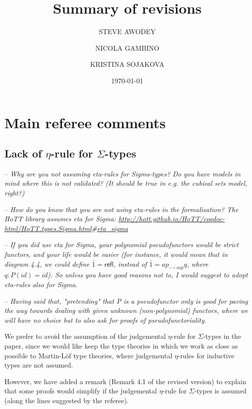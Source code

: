 \documentclass[10pt,a4paper,oneside,reqno]{amsart}
\numberwithin{equation}{section}
\theoremstyle{mythm}
\theoremstyle{mydef}
\theoremstyle{myrmk}
\newcommand{\refl}{\mathsf{refl}}
\begin{document}
\title[]{Summary of revisions}
\author[S. Awodey]{STEVE AWODEY}

\author[N. Gambino]{NICOLA GAMBINO}

\author[K. Sojakova]{KRISTINA SOJAKOVA}

\date{\today}

\maketitle

\section{Main referee comments}

\subsection*{Lack of $\eta$-rule for $\Sigma$-types} \hfill 

-- \emph{Why are you not assuming eta-rules for Sigma-types? Do you have models in mind where this is not validated? (It should be true in e.g. the cubical sets model, right?)}

-- \emph{How do you know that you are not using eta-rules in the formalisation? The HoTT library assumes eta for Sigma: \url{http://hott.github.io/HoTT/coqdoc-html/HoTT.types.Sigma.html}\#\url{eta_sigma}}

-- \emph{If you did use eta for Sigma, your polynomial pseudofunctors would be strict functors, and your life would be easier (for instance, it would mean that in diagram 4.4, we could define $\bar{1} = \refl$, instead of $\bar{1} = ap_{- \circ sup} q$, where $q : P(id) = id$). So unless you have good reasons not to, I would suggest to adopt eta-rules also for Sigma.}

-- \emph{Having said that, "pretending" that P is a pseudofunctor only is good for paving the way towards dealing with given unknown (non-polynomial) functors, where we will have no choice but to also ask for proofs of pseudofunctoriality.}


We prefer to avoid the assumption of the judgemental $\eta$-rule for $\Sigma$-types in the paper, since we would like keep the type theories in which we work as close as possible to Martin-L\"of type theories, where judgemental $\eta$-rules for inductive types are  not assumed.

However, we have added a remark (Remark 4.1 of the revised version) to explain that some proofs would simplify if the judgemental $\eta$-rule for $\Sigma$-types is assumed (along the lines suggested by the referee).
\end{document}
